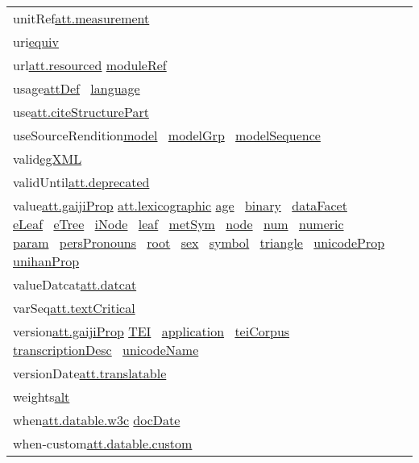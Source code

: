 \begin{longtable}{L{.2\textwidth}P{.8\textwidth}}
unitRef\tabcellsep \hyperref[TEI.att.measurement]{att.measurement}\\
uri\tabcellsep \hyperref[TEI.equiv]{equiv} \\
url\tabcellsep \hyperref[TEI.att.resourced]{att.resourced} \hyperref[TEI.moduleRef]{moduleRef} \\
usage\tabcellsep \hyperref[TEI.attDef]{attDef}  \hyperref[TEI.language]{language} \\
use\tabcellsep \hyperref[TEI.att.citeStructurePart]{att.citeStructurePart}\\
useSourceRendition\tabcellsep \hyperref[TEI.model]{model}  \hyperref[TEI.modelGrp]{modelGrp}  \hyperref[TEI.modelSequence]{modelSequence} \\
valid\tabcellsep \hyperref[TEI.egXML]{egXML} \\
validUntil\tabcellsep \hyperref[TEI.att.deprecated]{att.deprecated}\\
value\tabcellsep \hyperref[TEI.att.gaijiProp]{att.gaijiProp} \hyperref[TEI.att.lexicographic]{att.lexicographic} \hyperref[TEI.age]{age}  \hyperref[TEI.binary]{binary}  \hyperref[TEI.dataFacet]{dataFacet}  \hyperref[TEI.eLeaf]{eLeaf}  \hyperref[TEI.eTree]{eTree}  \hyperref[TEI.iNode]{iNode}  \hyperref[TEI.leaf]{leaf}  \hyperref[TEI.metSym]{metSym}  \hyperref[TEI.node]{node}  \hyperref[TEI.num]{num}  \hyperref[TEI.numeric]{numeric}  \hyperref[TEI.param]{param}  \hyperref[TEI.persPronouns]{persPronouns}  \hyperref[TEI.root]{root}  \hyperref[TEI.sex]{sex}  \hyperref[TEI.symbol]{symbol}  \hyperref[TEI.triangle]{triangle}  \hyperref[TEI.unicodeProp]{unicodeProp}  \hyperref[TEI.unihanProp]{unihanProp} \\
valueDatcat\tabcellsep \hyperref[TEI.att.datcat]{att.datcat}\\
varSeq\tabcellsep \hyperref[TEI.att.textCritical]{att.textCritical}\\
version\tabcellsep \hyperref[TEI.att.gaijiProp]{att.gaijiProp} \hyperref[TEI.TEI]{TEI}  \hyperref[TEI.application]{application}  \hyperref[TEI.teiCorpus]{teiCorpus}  \hyperref[TEI.transcriptionDesc]{transcriptionDesc}  \hyperref[TEI.unicodeName]{unicodeName} \\
versionDate\tabcellsep \hyperref[TEI.att.translatable]{att.translatable}\\
weights\tabcellsep \hyperref[TEI.alt]{alt} \\
when\tabcellsep \hyperref[TEI.att.datable.w3c]{att.datable.w3c} \hyperref[TEI.docDate]{docDate} \\
when-custom\tabcellsep \hyperref[TEI.att.datable.custom]{att.datable.custom}\\

\end{longtable}
